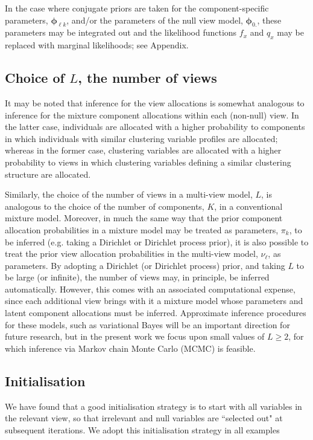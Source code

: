 \documentclass[12pt]{article}
\begin{document}
In the case where conjugate priors are taken for the component-specific parameters, $\boldsymbol{\phi}_{\ell k}$, and/or the parameters of the null view model, $\boldsymbol{\phi}_{0.}$, these parameters may be integrated out and the likelihood functions $f_x$ and $q_x$ may be replaced with marginal likelihoods; see Appendix.


\subsection{Choice of $L$, the number of views}
It may be noted that inference for the view allocations is somewhat analogous to inference for the mixture component allocations within each (non-null) view.  In the latter case, individuals are allocated with a higher probability to components in which individuals with similar clustering variable profiles are allocated; whereas in the former case, clustering variables are allocated with a higher probability to views in which clustering variables defining a similar clustering structure are allocated.    

Similarly, the choice of the number of views in a multi-view model, $L$, is analogous to the choice of the number of components, $K$, in a conventional mixture model.  Moreover, in much the same way that the prior component allocation probabilities in a mixture model may be treated as parameters, $\pi_k$, to be inferred (e.g. taking a Dirichlet or Dirichlet process prior), it is also possible to treat the prior view allocation probabilities in the multi-view model, $\nu_\ell$, as parameters.  By adopting a Dirichlet (or Dirichlet process) prior, and taking $L$ to be large (or infinite), the number of views may, in principle, be inferred automatically.  However, this comes with an associated computational expense, since each additional view brings with it a mixture model whose parameters and latent component allocations must be inferred.  Approximate inference procedures for these models, such as variational Bayes \citep[previously considered in the context of multi-view clustering by][]{Guan2010} will be an important direction for future research, but in the present work we focus upon small values of $L \ge 2$, for which inference via Markov chain Monte Carlo (MCMC) is feasible.   

\subsection{Initialisation}
We have found that a good initialisation strategy is to start with all variables in the relevant view, so that irrelevant and null variables are ``selected out" at subsequent iterations.  We adopt this initialisation strategy in all examples   
\end{document}
